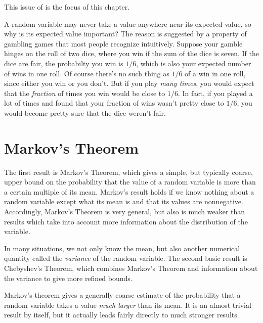 This issue of  is the focus of this
chapter.

\begin{editingnotes}
A random variable may never take a value anywhere near its expected value,
so why is its expected value important?  The reason is suggested by a
property of gambling games that most people recognize intuitively.
Suppose your gamble hinges on the roll of two dice, where you win if the
sum of the dice is seven.  If the dice are fair, the probabilty you win is
$1/6$, which is also your expected number of wins in one roll.  Of course
there's no such thing as $1/6$ of a win in one roll, since either you win
or you don't.  But if you play \emph{many times}, you would expect that
the \emph{fraction} of times you win would be close to $1/6$.  In fact, if
you played a lot of times and found that your fraction of wins wasn't
pretty close to $1/6$, you would become pretty sure that the dice weren't
fair.
\end{editingnotes}

\section{Markov's Theorem}

\begin{editingnotes}

The first result is Markov's Theorem, which gives a simple, but typically
coarse, upper bound on the probability that the value of a random variable
is more than a certain multiple of its mean.  Markov's result holds if we
know nothing about a random variable except what its mean is and that its
values are nonnegative.  Accordingly, Markov's Theorem is very general,
but also is much weaker than results which take into account more
information about the distribution of the variable.

In many situations, we not only know the mean, but also another numerical
quantity called the \emph{variance} of the random variable.  The second
basic result is Chebyshev's Theorem, which combines Markov's Theorem and
information about the variance to give more refined bounds.

\end{editingnotes}

Markov's theorem gives a generally coarse estimate of the probability
that a random variable takes a value \emph{much larger} than its mean.
It is an almost trivial result by itself, but it actually leads fairly
directly to much stronger results.

